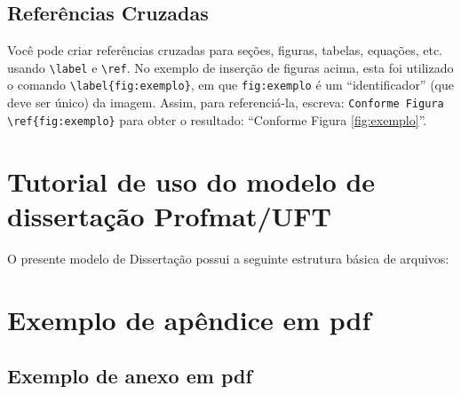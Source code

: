 \begin{apendicesenv}
\section*{Referências Cruzadas}

Você pode criar referências cruzadas para seções, figuras, tabelas, equações, etc. usando \texttt{\textbackslash label} e \texttt{\textbackslash ref}. No exemplo de inserção de figuras acima, esta foi utilizado o comando \verb|\label{fig:exemplo}|, em que \verb|fig:exemplo| é um ``identificador'' (que deve ser único) da imagem. Assim, para referenciá-la, escreva: \verb|Conforme Figura \ref{fig:exemplo}| para obter o resultado: ``Conforme Figura \ref{fig:exemplo}''.


\chapter{Tutorial de uso do modelo de dissertação Profmat/UFT}

O presente modelo de Dissertação possui a seguinte estrutura básica de arquivos:







\chapter{Exemplo de apêndice em pdf}

\end{apendicesenv}

\begin{anexosenv}



\chapter{Exemplo de anexo em pdf}

\end{anexosenv}
